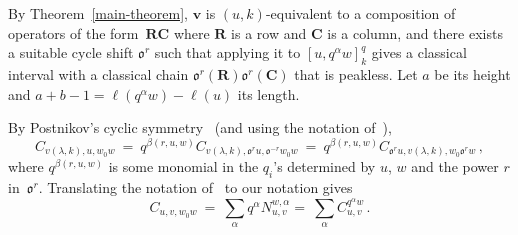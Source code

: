 \documentclass[11pt]{article}
\theoremstyle{definition}
\numberwithin{equation}{section}
\newcommand{\qv}{{\mathbf v}}
\newcommand{\ncycle}{\mathfrak o}
\def\R{\mathbf{R}}
\def\C{\mathbf{C}}
\begin{document}
By Theorem~\ref{main-theorem}, $\qv$ is $(u,k)$-equivalent to a composition of operators of the form~$\R\C$ where $\R$ is a row and $\C$ is a column, and there exists a
suitable cycle shift $\ncycle^r$ such that applying it to  $[u,q^\alpha w]^q_k$ gives a classical interval with
a classical chain $\ncycle^r(\R)\ncycle^r(\C)$ that is peakless.
Let $a$ be its height and $a+b-1=\ell(q^\alpha w)-\ell(u)$ its length.
 
By Postnikov's cyclic symmetry~\cite[Thm.~4]{Postnikov_symmetry} (and using the notation of~\cite{Postnikov_symmetry}),
\[
   C_{v(\lambda,k),u,w_0w}\ =\ q^{\beta(r,u,w)}C_{v(\lambda,k),\ncycle^{r} u,\ncycle^{-r}w_0w}\ =\ 
   q^{\beta(r,u,w)}C_{\ncycle^{r} u,v(\lambda,k),w_0\ncycle^{r}w}\,,
\]
where $q^{\beta(r,u,w)}$ is some monomial in the $q_i$'s determined by $u$, $w$ and the power $r$ in~$\ncycle^r$.
Translating the notation of~\cite{Postnikov_symmetry} to our notation gives
\[
C_{u,v,w_0w}\ =\ \sum_\alpha q^\alpha N_{u,v}^{w,\alpha}=\ \sum_\alpha C_{u,v}^{q^\alpha w} \,.
\]
\end{document}
